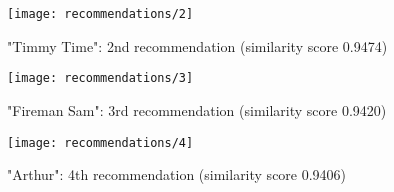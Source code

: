 \begin{figure}[h]
  \centering
  \texttt{[image: recommendations/2]}
  \caption{"Timmy Time": 2nd recommendation (similarity score 0.9474)}
  \label{fig:recommendations:1}
\end{figure}

\begin{figure}[h]
  \centering
  \texttt{[image: recommendations/3]}
  \caption{"Fireman Sam": 3rd recommendation (similarity score 0.9420)}
  \label{fig:recommendations:1}
\end{figure}

\begin{figure}[h]
  \centering
  \texttt{[image: recommendations/4]}
  \caption{"Arthur": 4th recommendation (similarity score 0.9406)}
  \label{fig:recommendations:1}
\end{figure}

